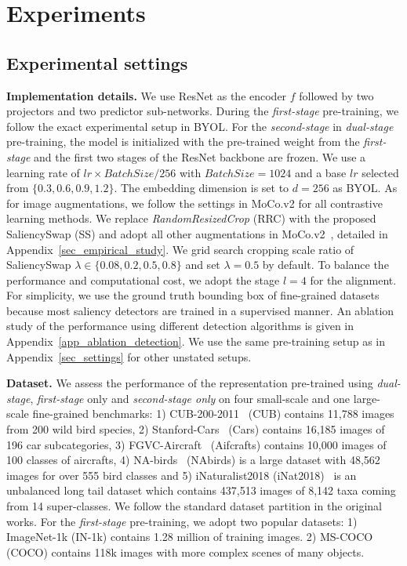 \vspace{-0.5em}
\section{Experiments}
\label{sec_exp}


\subsection{Experimental settings}
\textbf{Implementation details.}\quad
We use ResNet as the encoder $f$ followed by two projectors and two predictor sub-networks. During the \textit{first-stage} pre-training, we follow the exact experimental setup in BYOL. For the \textit{second-stage} in \textit{dual-stage} pre-training, the model is initialized with the pre-trained weight from the \textit{first-stage} and the first two stages of the ResNet backbone are frozen. We use a learning rate of $lr\times BatchSize/256$ with $BatchSize=1024$ and a base $lr$ selected from $\{0.3, 0.6, 0.9, 1.2\}$. The embedding dimension is set to $d=256$ as BYOL. As for image augmentations, we follow the settings in MoCo.v2 for all contrastive learning methods. We replace \textit{RandomResizedCrop} (RRC) with the proposed SaliencySwap (SS) and adopt all other augmentations in MoCo.v2~\cite{2020mocov2}, detailed in Appendix~\ref{sec_empirical_study}. We grid search cropping scale ratio of SaliencySwap $\lambda \in \{0.08, 0.2, 0.5, 0.8\}$ and set $\lambda=0.5$ by default. To balance the performance and computational cost, we adopt the stage $l=4$ for the alignment. For simplicity, we use the ground truth bounding box of fine-grained datasets because most saliency detectors are trained in a supervised manner. 
An ablation study of the performance using different detection algorithms is given in Appendix~\ref{app_ablation_detection}.
We use the same pre-training setup as in Appendix~\ref{sec_settings} for other unstated setups.

\textbf{Dataset.}\quad
We assess the performance of the representation pre-trained using \textit{dual-stage}, \textit{first-stage} only and \textit{second-stage only} on four small-scale and one large-scale fine-grained benchmarks: 1) CUB-200-2011~\cite{wah2011caltech} (CUB) contains 11,788 images from 200 wild bird species, 2) Stanford-Cars~\cite{krause20133d} (Cars) contains 16,185 images of 196 car subcategories, 3) FGVC-Aircraft~\cite{maji2013fine} (Aifcrafts) contains 10,000 images of 100 classes of aircrafts, 4) NA-birds~\cite{van2015building} (NAbirds) is a large dataset with 48,562 images for over 555 bird classes and 5) iNaturalist2018 (iNat2018)~\cite{cvpr2018inaturalist} is an unbalanced long tail dataset which contains 437,513 images of 8,142 taxa coming from 14 super-classes. We follow the standard dataset partition in the original works. For the \textit{first-stage} pre-training, we adopt two popular datasets: 1) ImageNet-1k (IN-1k) contains 1.28 million of training images. 2) MS-COCO (COCO) contains 118k images with more complex scenes of many objects.



